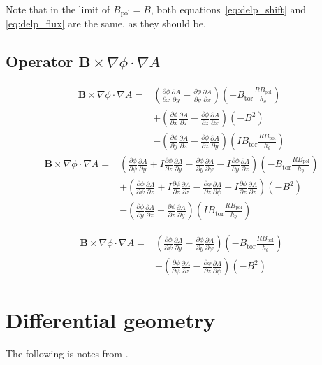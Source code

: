 \documentclass[12pt]{article}
\newcommand{\deriv}[2]{\ensuremath{\frac{\partial #1}{\partial #2}}}
\newcommand{\hthe}{\ensuremath{h_\theta}}
\newcommand{\Bp}{\ensuremath{B_{\text{pol}}}}
\newcommand{\Bt}{\ensuremath{B_{\text{tor}}}}
\newcommand{\ve}[1]{\ensuremath{\boldsymbol{#1}}}
\newcommand{\Bvec}{\ve{B}}
\newcommand{\rbp}{\ensuremath{R\Bp}}
\begin{document}
Note that in the limit of $\Bp = B$, both equations~\ref{eq:delp_shift} 
and \ref{eq:delp_flux} are the same, as they should be.



\subsection{Operator \texorpdfstring{$\Bvec\times\nabla\phi\cdot\nabla A$}{Bx 
Nabla Phi Dot Nabla A}}
%
\begin{align*}
\Bvec\times\nabla\phi\cdot\nabla A =& \left(\deriv{\phi}{x}\deriv{A}{y} - 
\deriv{\phi}{y}\deriv{A}{x}\right)\left(-\Bt\frac{\rbp}{\hthe}\right) \\
&+ \left(\deriv{\phi}{x}\deriv{A}{z} - 
\deriv{\phi}{z}\deriv{A}{x}\right)\left(-B^2\right) \\
&- \left(\deriv{\phi}{y}\deriv{A}{z} - 
\deriv{\phi}{z}\deriv{A}{y}\right)\left(I\Bt\frac{\rbp}{\hthe}\right)
\end{align*}
%
%
\begin{align*}
\Bvec\times\nabla\phi\cdot\nabla A =& \left(\deriv{\phi}{\psi}\deriv{A}{y} + I 
\deriv{\phi}{z}\deriv{A}{y} - \deriv{\phi}{y}\deriv{A}{\psi} - 
I\deriv{\phi}{y}\deriv{A}{z}\right)\left(-\Bt\frac{\rbp}{\hthe}\right) \\
&+ \left(\deriv{\phi}{\psi}\deriv{A}{z} + I\deriv{\phi}{z}\deriv{A}{z} - 
\deriv{\phi}{z}\deriv{A}{\psi} - 
I\deriv{\phi}{z}\deriv{A}{z}\right)\left(-B^2\right) \\
&- \left(\deriv{\phi}{y}\deriv{A}{z} - 
\deriv{\phi}{z}\deriv{A}{y}\right)\left(I\Bt\frac{\rbp}{\hthe}\right)
\end{align*}
%

%
\begin{align*}
\Bvec\times\nabla\phi\cdot\nabla A =& \left(\deriv{\phi}{\psi}\deriv{A}{y} - 
\deriv{\phi}{y}\deriv{A}{\psi}\right)\left(-\Bt\frac{\rbp}{\hthe}\right) 
\nonumber \\
&+ \left(\deriv{\phi}{\psi}\deriv{A}{z} - \deriv{\phi}{z}\deriv{A}{\psi} 
\right)\left(-B^2\right)
\end{align*}
%






\appendix



\section{Differential geometry}
The following is notes from \cite{hazeltine-2003}.
\end{document}
